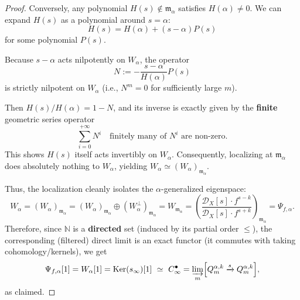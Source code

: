 \begin{proof}
    Conversely, any polynomial $H(s) \notin \mathfrak{m}_\alpha$ satisfies $H(\alpha) \neq 0$.
    We can expand $H(s)$ as a polynomial around $s=\alpha$:
    \[
        H(s) = H(\alpha) + (s-\alpha)P(s)
    \]
    for some polynomial $P(s)$.

    Because $s-\alpha$ acts nilpotently on $W_\alpha$, the operator
    \[
        N := -\frac{s-\alpha}{H(\alpha)}P(s)
    \]
    is strictly nilpotent on $W_\alpha$ (i.e., $N^m = 0$ for sufficiently large $m$).

    Then $H(s) / H(\alpha) = 1 - N$, and its inverse is exactly given by the \textbf{finite} geometric series operator
    \[
        \sum_{i=0}^{+\infty} N^i \quad \text{finitely many of } N^i \text{ are non-zero}.
    \]
    This shows $H(s)$ itself acts invertibly on $W_\alpha$. Consequently, localizing at $\mathfrak{m}_\alpha$ does absolutely nothing to $W_\alpha$, yielding $W_\alpha \simeq (W_\alpha)_{\mathfrak{m}_\alpha}$.

    Thus, the localization cleanly isolates the $\alpha$-generalized eigenspace:
    \[
        W_\alpha = (W_\alpha)_{\mathfrak{m}_\alpha} = (W_\alpha)_{\mathfrak{m}_\alpha} \oplus (W_\alpha^\perp)_{\mathfrak{m}_\alpha} = W_{\mathfrak{m}_\alpha} = \left( \frac{\mathcal{D}_X[s] \cdot f^{s-k}}{\mathcal{D}_X[s] \cdot f^{s+k}} \right)_{\mathfrak{m}_\alpha} = \Psi_{f,\alpha}.
    \]
    Therefore, since $\mathbb{N}$ is a \textbf{directed} set (induced by its partial order $\le$), the corresponding (filtered) direct limit is an exact functor (it commutes with taking cohomology/kernels)\cite[\href{https://stacks.math.columbia.edu/tag/00DB}{Tag 00DB}]{stacks-project}, we get
    \[
        \Psi_{f,\alpha}[1] = W_\alpha[1] = \mathrm{Ker}(s_\infty)[1]\ \simeq\  C_\infty^\bullet = \varinjlim_{m}\Bigl[Q_m^{\alpha,k}\xrightarrow{s}Q_m^{\alpha,k}\Bigr],
    \]
    as claimed.

\end{proof}

